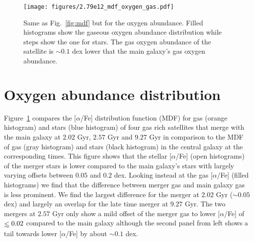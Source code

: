 \documentclass[useAMS,usenatbib]{mnras}
\def\lesssim{\mathrel{\hbox{\rlap{\hbox{\lower4pt\hbox{$\sim$}}}\hbox{$<$}}}}
\begin{document}
\begin{figure*}
    \begin{centering}
        \texttt{[image: figures/2.79e12\_mdf\_oxygen\_gas.pdf]}
        \vspace*{-1.75em}
        \caption{
            Same as Fig.~\ref{fig:mdf} but for the oxygen abundance. Filled histograms show the gaseous oxygen abundance distribution while steps show the one for stars. The gas oxygen abundance of the satellite is  $\sim0.1$ dex lower that the main galaxy's gas oxygen abundance.
        }
        \label{fig:mdf_oxygen}
    \end{centering}
\end{figure*}

\section{Oxygen abundance distribution}

Figure~\ref{fig:mdf_oxygen} compares the [$\alpha$/Fe] distribution function (MDF) for gas (orange histogram) and stars (blue histogram) of four gas rich satellites that merge with the main galaxy at $2.02$ Gyr, $2.57$ Gyr and $9.27$ Gyr in comparison to the MDF of gas (gray histogram) and stars (black histogram) in the central galaxy at the corresponding times.
This figure shows that the stellar [$\alpha$/Fe] (open histograms) of the merger stars is lower compared to the main galaxy's stars with largely varying offsets between $0.05$ and $0.2$ dex. Looking instead at the gas [$\alpha$/Fe] (filled histograms) we find that the difference between merger gas and main galaxy gas is less prominent. We find the largest difference for the merger at $2.02$ Gyr ($\sim0.05$ dex) and largely an overlap for the late time merger at $9.27$ Gyr. The two mergers at $2.57$ Gyr only show a mild offset of the merger gas to lower [$\alpha$/Fe] of $\lesssim0.02$ compared to the main galaxy although the second panel from left shows a tail towards lower [$\alpha$/Fe] by about $\sim0.1$ dex.




\label{lastpage}
\end{document}
